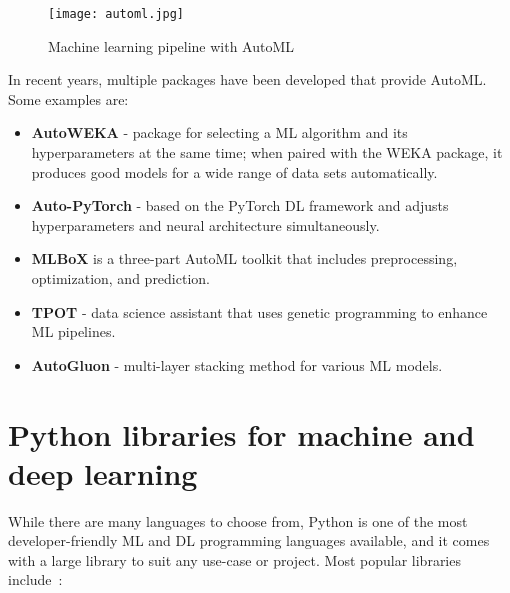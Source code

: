\begin{figure}[htbp]
    \centering
    \texttt{[image: automl.jpg]}
    \caption{Machine learning pipeline with AutoML~\cite{Waring2020AutomatedHealthcare}}
    \label{fig:automl}
\end{figure}

In recent years, multiple packages have been developed that provide \gls{AutoML}. Some examples are:

\begin{itemize}
    \item \textbf{AutoWEKA} - package for selecting a \gls{ML} algorithm and its hyperparameters at the same time; when paired with the WEKA package, it produces good models for a wide range of data sets automatically.
    
    \item \textbf{Auto-PyTorch} - based on the PyTorch \gls{DL} framework and adjusts hyperparameters and neural architecture simultaneously.
    
    \item \textbf{MLBoX} is a three-part \gls{AutoML} toolkit that includes preprocessing, optimization, and prediction.
    
    \item \textbf{TPOT} - data science assistant that uses genetic programming to enhance \gls{ML} pipelines.
    
    \item \textbf{AutoGluon} - multi-layer stacking method for various \gls{ML} models.
    
\end{itemize}


\section{Python libraries for machine and deep learning}\label{sec:ML_DL_libraries}

While there are many languages to choose from, Python is one of the most developer-friendly \gls{ML} and \gls{DL} programming languages available, and it comes with a large library to suit any use-case or project. Most popular libraries include~\cite{JonssonWaysDevelopment,Paszke2019PyTorch:Library}:

